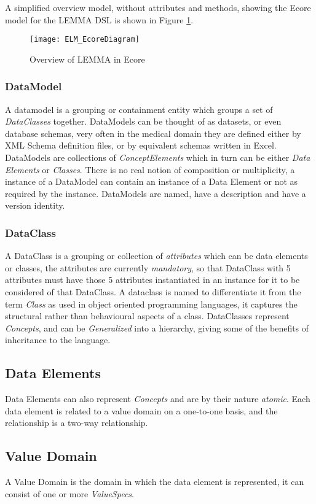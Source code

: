 A simplified overview model, without attributes and methods, showing the Ecore model for the LEMMA DSL is shown in Figure \ref{fig:mcSimplifiedOverview}.
\begin{figure}[here]
	\texttt{[image: ELM\_EcoreDiagram]}
	\caption{Overview of LEMMA in Ecore} 
	\label{fig:mcSimplifiedOverview}
\end{figure}

\subsubsection{DataModel}
A datamodel is a grouping or containment entity which groups a set of \emph{DataClasses} together. DataModels can be thought of as datasets, or even database schemas, very often in the medical domain they are defined either by XML Schema definition files, or by equivalent schemas written in Excel. 
DataModels are collections of \emph{ConceptElements} which in turn can be either \emph{Data Elements} or \emph{Classes}. There is no real notion of composition or multiplicity, a instance of a DataModel can contain an instance of a Data Element or not as required by the instance.  DataModels are named, have a description and have a version identity.
\subsubsection{DataClass}
A DataClass is a grouping or collection of \emph{attributes} which can be data elements or classes, the attributes are currently \emph{mandatory}, so that DataClass with 5 attributes must have those 5 attributes instantiated in an instance for it to be considered of that DataClass. A dataclass is named to differentiate it from the term \emph{Class} as used in object oriented programming languages, it captures the structural rather than behavioural aspects of a class.  DataClasses represent \emph{Concepts}, and can be \emph{Generalized} into a hierarchy, giving some of the benefits of inheritance to the language.  
\subsection{Data Elements} 
Data Elements can also represent \emph{Concepts} and are by their nature \emph{atomic}.  Each data element is related to a value domain on a one-to-one basis, and the relationship is a two-way relationship.
\subsection{Value Domain}
A Value Domain is the domain in which the data element is represented, it can consist of one or more \emph{ValueSpecs}.

